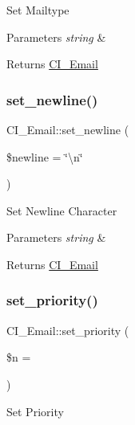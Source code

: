 Set Mailtype


\begin{DoxyParams}{Parameters}
{\em string} & \\
\hline
\end{DoxyParams}
\begin{DoxyReturn}{Returns}
\mbox{\hyperlink{class_c_i___email}{C\+I\+\_\+\+Email}} 
\end{DoxyReturn}
\mbox{\label{class_c_i___email_a78022b6d42b16aa9a8bb44304e030c8d}} 
\subsubsection{\texorpdfstring{set\+\_\+newline()}{set\_newline()}}
{\footnotesize\ttfamily C\+I\+\_\+\+Email\+::set\+\_\+newline (\begin{DoxyParamCaption}\item[{}]{\$newline = {\ttfamily \char`\"{}\textbackslash{}n\char`\"{}} }\end{DoxyParamCaption})}

Set Newline Character


\begin{DoxyParams}{Parameters}
{\em string} & \\
\hline
\end{DoxyParams}
\begin{DoxyReturn}{Returns}
\mbox{\hyperlink{class_c_i___email}{C\+I\+\_\+\+Email}} 
\end{DoxyReturn}
\mbox{\label{class_c_i___email_a4ff56cbd411a4ac7539a0ca867ea86d3}} 
\subsubsection{\texorpdfstring{set\+\_\+priority()}{set\_priority()}}
{\footnotesize\ttfamily C\+I\+\_\+\+Email\+::set\+\_\+priority (\begin{DoxyParamCaption}\item[{}]{\$n = {} }\end{DoxyParamCaption})}

Set Priority


